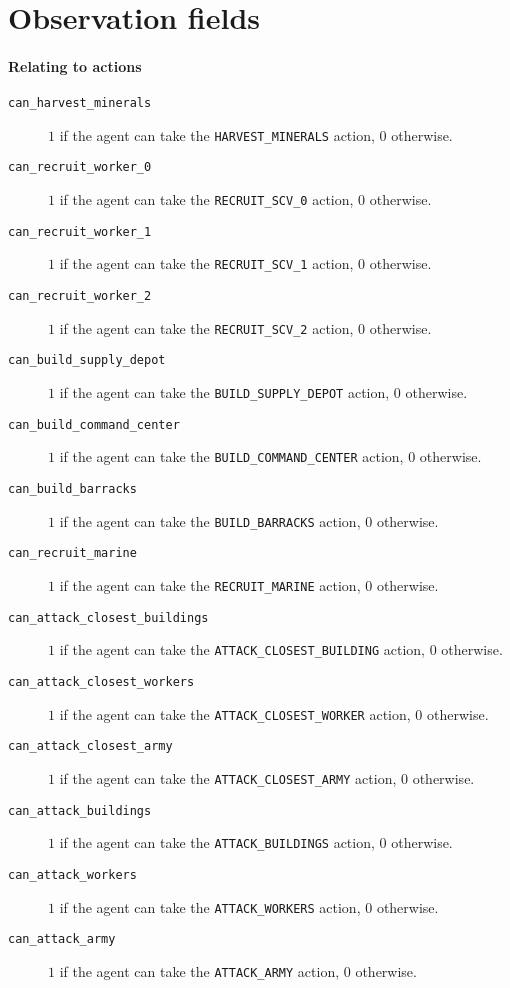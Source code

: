 \chapter{Observation fields}
\label{app:observation}

\subsubsection*{Relating to actions}
\begin{description}
    \item[\texttt{can\_harvest\_minerals}] $1$ if the agent can take the \texttt{HARVEST\_MINERALS} action, $0$ otherwise.
    \item[\texttt{can\_recruit\_worker\_0}] $1$ if the agent can take the \texttt{RECRUIT\_SCV\_0} action, $0$ otherwise.
    \item[\texttt{can\_recruit\_worker\_1}] $1$ if the agent can take the \texttt{RECRUIT\_SCV\_1} action, $0$ otherwise.
    \item[\texttt{can\_recruit\_worker\_2}] $1$ if the agent can take the \texttt{RECRUIT\_SCV\_2} action, $0$ otherwise.
    \item[\texttt{can\_build\_supply\_depot}] $1$ if the agent can take the \texttt{BUILD\_SUPPLY\_DEPOT} action, $0$ otherwise.
    \item[\texttt{can\_build\_command\_center}] $1$ if the agent can take the \texttt{BUILD\_COMMAND\_CENTER} action, $0$ otherwise.
    \item[\texttt{can\_build\_barracks}] $1$ if the agent can take the \texttt{BUILD\_BARRACKS} action, $0$ otherwise.
    \item[\texttt{can\_recruit\_marine}] $1$ if the agent can take the \texttt{RECRUIT\_MARINE} action, $0$ otherwise.
    \item[\texttt{can\_attack\_closest\_buildings}] $1$ if the agent can take the \texttt{ATTACK\_CLOSEST\_BUILDING} action, $0$ otherwise.
    \item[\texttt{can\_attack\_closest\_workers}] $1$ if the agent can take the \texttt{ATTACK\_CLOSEST\_WORKER} action, $0$ otherwise.
    \item[\texttt{can\_attack\_closest\_army}] $1$ if the agent can take the \texttt{ATTACK\_CLOSEST\_ARMY} action, $0$ otherwise.
    \item[\texttt{can\_attack\_buildings}] $1$ if the agent can take the \texttt{ATTACK\_BUILDINGS} action, $0$ otherwise.
    \item[\texttt{can\_attack\_workers}] $1$ if the agent can take the \texttt{ATTACK\_WORKERS} action, $0$ otherwise.
    \item[\texttt{can\_attack\_army}] $1$ if the agent can take the \texttt{ATTACK\_ARMY} action, $0$ otherwise.
\end{description}

